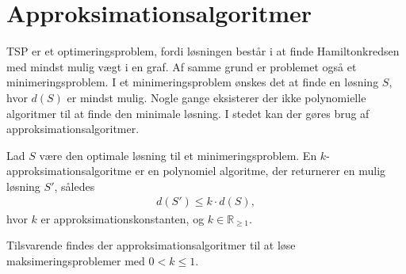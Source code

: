 \section{Approksimationsalgoritmer}
TSP er et optimeringsproblem, fordi løsningen består i at finde Hamiltonkredsen med mindst mulig vægt i en graf. 
Af samme grund er problemet også et minimeringsproblem. 
I et minimeringsproblem ønskes det at finde en løsning $S$, hvor $d(S)$ er mindst mulig.
Nogle gange eksisterer der ikke polynomielle algoritmer til at finde den minimale løsning.
I stedet kan der gøres brug af approksimationsalgoritmer.

\begin{defn}\label{def:apk}
Lad $S$ være den optimale løsning til et minimeringsproblem. En $k$-approksimationsalgoritme er en polynomiel algoritme, der returnerer en mulig løsning $S'$, således
\begin{align*}
d(S') \leq k \cdot d(S),
\end{align*}
hvor $k$ er approksimationskonstanten, og $k \in \mathbb{R}_{\geq 1}$.
\end{defn}

Tilsvarende findes der approksimationsalgoritmer til at løse maksimeringsproblemer med $0 < k \leq 1$. \citep{approksalg}
